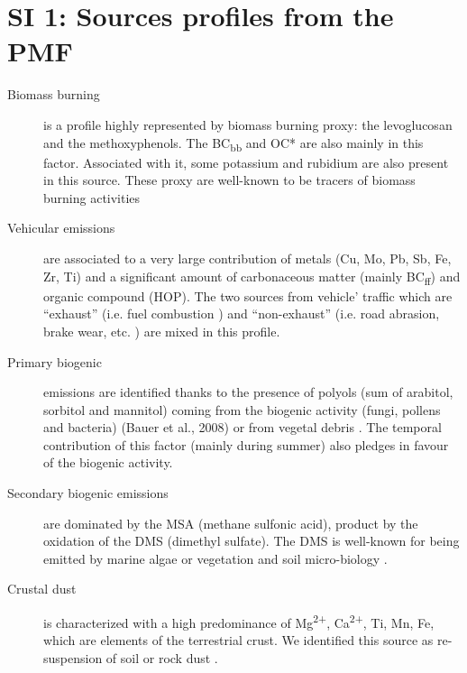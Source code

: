 \documentclass[12pt]{article}
\begin{document}
\section{SI 1: Sources profiles from the PMF}
\label{si-1-sources-profiles-from-the-pmf}

\begin{description}
    \item[Biomass burning] is a profile highly represented by biomass
burning proxy: the levoglucosan and the methoxyphenols. The
BC\textsubscript{bb} and OC* are also mainly in this factor. Associated
with it, some potassium and rubidium are also present in this source.
These proxy are well-known to be tracers of biomass burning activities
\citep{godoy_aerosol_2005,jordan_levoglucosan_2006,nava_biomass_2015,puxbaum_levoglucosan_2007}

\item[Vehicular emissions] are associated to a very large contribution
of metals (Cu, Mo, Pb, Sb, Fe, Zr, Ti) and a significant amount of
carbonaceous matter (mainly BC\textsubscript{ff}) and organic compound
(HOP). The two sources from vehicle' traffic which are ``exhaust'' (i.e.
    fuel combustion \citep{allen_size_2001,hu_metals_2009,viana_source_2008}) and ``non-exhaust'' (i.e. road abrasion, brake wear, etc.
\citep{sanders_airborne_2003,sternbeck_metal_2002}) are mixed in this
profile.

\item[Primary biogenic] emissions are identified thanks to the
presence of polyols (sum of arabitol, sorbitol and mannitol) coming from
the biogenic activity (fungi, pollens and bacteria) (Bauer et al., 2008)
or from vegetal debris \citep{yttri_ambient_2007}. The temporal contribution
of this factor (mainly during summer) also pledges in favour of the
biogenic activity.

\item[Secondary biogenic emissions] are dominated by the MSA (methane
sulfonic acid), product by the oxidation of the DMS (dimethyl sulfate).
The DMS is well-known for being emitted by marine algae
\citep{saltzman_methane_1983,zhang_surface_2014} or vegetation and soil
micro-biology \citep{jardine_dimethyl_2015}.

\item[Crustal dust] is characterized with a high predominance of
Mg\textsuperscript{2+}, Ca\textsuperscript{2+}, Ti, Mn, Fe, which are
elements of the terrestrial crust. We identified this source as
re-suspension of soil or rock dust
\citep{almeida_source_2005,dallosto_hourly_2013,moreno_variations_2011,putaud_size-segregated_2004}.


\end{description}
\end{document}

